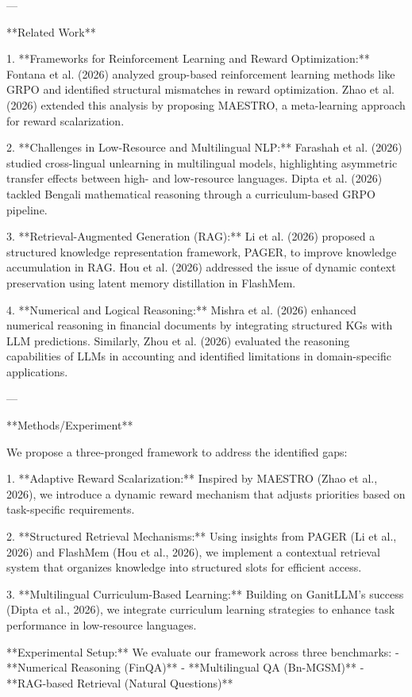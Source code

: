 ---

**Related Work**  

1. **Frameworks for Reinforcement Learning and Reward Optimization:**  
Fontana et al. (2026) analyzed group-based reinforcement learning methods like GRPO and identified structural mismatches in reward optimization. Zhao et al. (2026) extended this analysis by proposing MAESTRO, a meta-learning approach for reward scalarization.  

2. **Challenges in Low-Resource and Multilingual NLP:**  
Farashah et al. (2026) studied cross-lingual unlearning in multilingual models, highlighting asymmetric transfer effects between high- and low-resource languages. Dipta et al. (2026) tackled Bengali mathematical reasoning through a curriculum-based GRPO pipeline.  

3. **Retrieval-Augmented Generation (RAG):**  
Li et al. (2026) proposed a structured knowledge representation framework, PAGER, to improve knowledge accumulation in RAG. Hou et al. (2026) addressed the issue of dynamic context preservation using latent memory distillation in FlashMem.  

4. **Numerical and Logical Reasoning:**  
Mishra et al. (2026) enhanced numerical reasoning in financial documents by integrating structured KGs with LLM predictions. Similarly, Zhou et al. (2026) evaluated the reasoning capabilities of LLMs in accounting and identified limitations in domain-specific applications.  

---

**Methods/Experiment**  

We propose a three-pronged framework to address the identified gaps:  

1. **Adaptive Reward Scalarization:** Inspired by MAESTRO (Zhao et al., 2026), we introduce a dynamic reward mechanism that adjusts priorities based on task-specific requirements.  

2. **Structured Retrieval Mechanisms:** Using insights from PAGER (Li et al., 2026) and FlashMem (Hou et al., 2026), we implement a contextual retrieval system that organizes knowledge into structured slots for efficient access.  

3. **Multilingual Curriculum-Based Learning:** Building on GanitLLM's success (Dipta et al., 2026), we integrate curriculum learning strategies to enhance task performance in low-resource languages.  

**Experimental Setup:**  
We evaluate our framework across three benchmarks:  
- **Numerical Reasoning (FinQA)**  
- **Multilingual QA (Bn-MGSM)**  
- **RAG-based Retrieval (Natural Questions)**  

